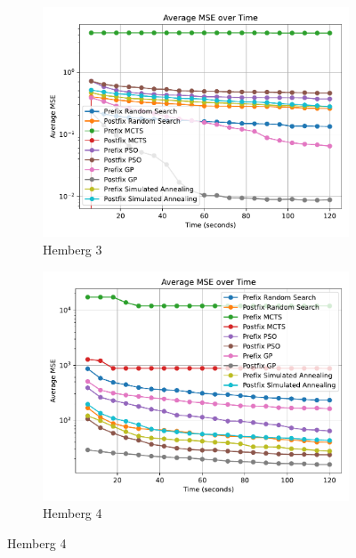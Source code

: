 \documentclass[runningheads]{llncs}
\begin{document}
\begin{figure}
    \vspace{0.5cm}
    
    \begin{subfigure}[b]{0.4\textwidth}
        \includegraphics[width=\linewidth, keepaspectratio]{Hemberg_Benchmarks/Hemberg_Benchmark_3.pdf}
        \caption{Hemberg 3}
        \label{subfig:hemberg_3}
    \end{subfigure}
    \begin{subfigure}[b]{0.4\textwidth}
        \includegraphics[width=\linewidth, keepaspectratio]{Hemberg_Benchmarks/Hemberg_Benchmark_4.pdf}
        \caption{Hemberg 4}
        \label{subfig:hemberg_4}
    \end{subfigure}
    

\end{figure}
\end{document}
